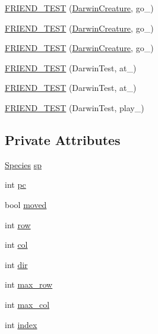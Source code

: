 \begin{DoxyCompactItemize}
\item 
\hyperlink{classCreature_a41622e069e8952c2fde4648c9bfa2d24}{F\-R\-I\-E\-N\-D\-\_\-\-T\-E\-S\-T} (\hyperlink{classCreature_a16df2cdab1d993dc2dcb9db1b56dd808}{Darwin\-Creature}, go\-\_)
\item 
\hyperlink{classCreature_a530357c0d01ca230e2713577db8f88ee}{F\-R\-I\-E\-N\-D\-\_\-\-T\-E\-S\-T} (\hyperlink{classCreature_a16df2cdab1d993dc2dcb9db1b56dd808}{Darwin\-Creature}, go\-\_)
\item 
\hyperlink{classCreature_af1ec826cb646763ab018a3a66d5abee3}{F\-R\-I\-E\-N\-D\-\_\-\-T\-E\-S\-T} (\hyperlink{classCreature_a16df2cdab1d993dc2dcb9db1b56dd808}{Darwin\-Creature}, go\-\_)
\item 
\hyperlink{classCreature_a0a25f6a387ad10d952c14864faa94a37}{F\-R\-I\-E\-N\-D\-\_\-\-T\-E\-S\-T} (Darwin\-Test, at\-\_)
\item 
\hyperlink{classCreature_a9babc64c0a79e5e493930735a60b1108}{F\-R\-I\-E\-N\-D\-\_\-\-T\-E\-S\-T} (Darwin\-Test, at\-\_)
\item 
\hyperlink{classCreature_a9b8dd7a87699c26c358d8ecb98f89414}{F\-R\-I\-E\-N\-D\-\_\-\-T\-E\-S\-T} (Darwin\-Test, play\-\_)
\end{DoxyCompactItemize}
\subsection*{Private Attributes}
\begin{DoxyCompactItemize}
\item 
\hyperlink{classSpecies}{Species} \hyperlink{classCreature_ac630fe7db462274fc5546effe9fdba92}{sp}
\item 
int \hyperlink{classCreature_a81b808ceee6ddc5c0a97e0b97b19a707}{pc}
\item 
bool \hyperlink{classCreature_a4b02dbc0cbbad42704ac20f3fbe52eee}{moved}
\item 
int \hyperlink{classCreature_af069d60a967697bdc03404639fb0e494}{row}
\item 
int \hyperlink{classCreature_a0c3719e1305f2667b08addeec7bc59d2}{col}
\item 
int \hyperlink{classCreature_affc8d6b2f849b1bc3199c459151f8ce7}{dir}
\item 
int \hyperlink{classCreature_a6faf65ef350cd117d9d6390601ff85c3}{max\-\_\-row}
\item 
int \hyperlink{classCreature_aa3962eff5df61b979613c35e3ae750fd}{max\-\_\-col}
\item 
int \hyperlink{classCreature_adab2dc50d1556d82299c3dd3db9597f8}{index}
\end{DoxyCompactItemize}
